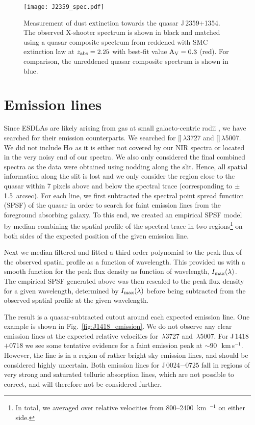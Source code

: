 \documentclass[fleqn,usenatbib,useAMS]{mnras}
\newcommand{\kms}{\,km\,s$^{-1}$} %
\newcommand{\zabs}{\ensuremath{z_{\rm abs}}}
\begin{document}
\begin{figure*}
\texttt{[image: J2359\_spec.pdf]}
\caption{Measurement of dust extinction towards the quasar J\,2359$+$1354. The observed X-shooter spectrum is shown in black and matched using a quasar composite spectrum from \citep{Selsing2016} reddened with SMC extinction law at $\zabs=2.25$ with best-fit value $\rm A_V = 0.3$ (red). For comparison, the unreddened quasar composite spectrum is shown in blue.}
\label{fig:J2359_av}
\end{figure*}

\section{Emission lines}

Since ESDLAs are likely arising from gas at small galacto-centric radii \citep{Ranjan2020}, we have searched for their emission counterparts. We searched for 
[]\,$\lambda$3727 and []\,$\lambda$5007. We did not include H$\alpha$ 
as it is either not covered by our NIR spectra or located in the very noisy end of our spectra. 
We also only considered the final combined spectra as the data were obtained using nodding along the slit. Hence, all spatial information along the slit is lost and we only consider the region close to the quasar within 7 pixels above and below the spectral trace (corresponding to $\pm$1.5~arcsec).
For each line, we first subtracted the spectral point spread function (SPSF) of the quasar in order to search for faint emission lines from the foreground absorbing galaxy.  
To this end, we created an empirical SPSF model by median combining the spatial profile of the spectral trace in two regions\footnote{In total, we averaged over relative velocities from 800--2400~km~$^{-1}$ on either side.} on both sides of the expected position of the given emission line.

Next we median filtered and fitted a third order polynomial to the peak flux of the observed spatial profile as a function of wavelength. This provided us with a smooth function for the peak flux density as function of wavelength, $I_{\rm max}(\lambda)$. The empirical SPSF generated above was then rescaled to the peak flux density for a given wavelength, determined by $I_{\rm max}(\lambda)$ before being subtracted from the observed spatial profile at the given wavelength.

The result is a quasar-subtracted cutout around each expected emission line. One example is shown in Fig.~\ref{fig:J1418_emission}. We do not observe any clear emission lines at the expected relative velocities for \,$\lambda$3727 and \,$\lambda$5007. For J\,1418$+$0718 we see some tentative evidence for a faint emission peak at $\sim90$~\kms. However, the line is in a region of rather bright sky emission lines, and should be considered highly uncertain.
Both emission lines for J\,0024$-$0725 fall in regions of very strong and saturated telluric absorption lines, which are not possible to correct, and will therefore not be considered further.
\end{document}
